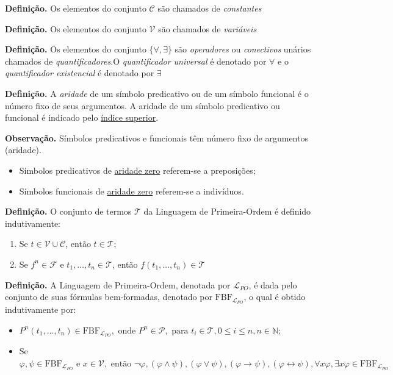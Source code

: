         \textbf{Definição.} Os elementos do conjunto $\mathcal{C}$ são chamados de \textit{constantes} 
        
        \textbf{Definição.} Os elementos do conjunto $\mathcal{V}$ são chamados de \textit{variáveis} 
        
        \textbf{Definição.} Os elementos do conjunto $\{ \forall,\exists \}$ são \textit{operadores} ou \textit{conectivos} unários chamados de 
        \textit{quantificadores}.O \textit{quantificador universal} é denotado por $\forall$ e o \textit{quantificador existencial} é denotado por $\exists$ 
        
        \textbf{Definição.} A \textit{aridade} de um símbolo predicativo ou de um símbolo funcional é o número fixo de seus argumentos. A aridade de um símbolo predicativo ou funcional é indicado pelo \underline{índice superior}.
        
        \textbf{Observação.} Símbolos predicativos e funcionais têm número fixo de argumentos (aridade). 
            \begin{itemize}[left=0.5cm, align=left, nosep]
                \item Símbolos predicativos de \underline{aridade zero} referem-se a preposições;
                \item Símbolos funcionais de \underline{aridade zero} referem-se a indivíduos.
            \end{itemize}
        
        \textbf{Definição.} O conjunto de termos $\mathcal{T}$ da Linguagem de Primeira-Ordem é definido indutivamente:
            \begin{enumerate}[left=0.5cm, align=left, nosep]
                \item Se $t \in \mathcal{V} \cup \mathcal{C}$, então $t \in \mathcal{T}$;
                \item Se $f^n \in \mathcal{F}$ e $t_1,\dots,t_n \in \mathcal{T}$, então $f(t_1,\dots,t_n) \in \mathcal{T}$
            \end{enumerate}

        \textbf{Definição.} A Linguagem de Primeira-Ordem, denotada por $\mathcal{L}_{PO}$, é dada pelo conjunto de suas 
        fórmulas bem-formadas, denotado por $\text{FBF}_{\mathcal{L}_{PO}}$, o qual é obtido indutivamente por:
            \begin{itemize}[left=0.5cm, align=left, nosep]
                \item $P^n(t_1,\dots,t_n) \in \text{FBF}_{\mathcal{L}_{PO}}, \text{ onde } P^n \in \mathcal{P}, \text{ para } t_i \in \mathcal{T}, 0 \leq i \leq n, n \in \mathbb{N} $;
                \item Se $\varphi,\psi \in \text{FBF}_{\mathcal{L}_{PO}} \text{ e } x \in \mathcal{V}, \text{ então } \neg \varphi ,(\varphi \land \psi),(\varphi \lor \psi),(\varphi \rightarrow \psi),(\varphi \leftrightarrow \psi), \forall x \varphi , \exists x \varphi \in \text{FBF}_{\mathcal{L}_{PO}}$   
            \end{itemize}
        
